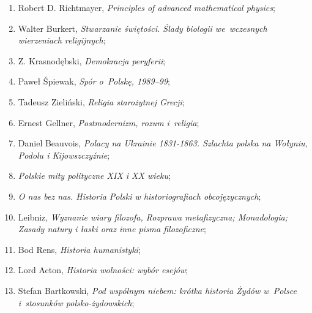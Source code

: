 \documentclass[a4paper,11pt]{article}
\begin{document}
\begin{enumerate}
\item Robert D. Richtmayer, \textit{Principles of advanced mathematical
    physics};



\item Walter Burkert, \textit{Stwarzanie świętości. Ślady biologii
    we~wczesnych wierzeniach religijnych};



\item Z. Krasnodębski, \textit{Demokracja peryferii};



\item Paweł Śpiewak, \textit{Spór o~Polskę, 1989--99};



\item Tadeusz Zieliński, \textit{Religia starożytnej Grecji};



\item Ernest Gellner, \textit{Postmodernizm, rozum i~religia};



\item Daniel Beauvois, \textit{Polacy na Ukrainie 1831-1863. Szlachta
    polska na Wołyniu, Podolu i Kijowszczyźnie};



\item \textit{Polskie mity polityczne XIX i XX wieku};



\item \textit{O nas bez nas. Historia Polski w historiografiach
    obcojęzycznych};



\item Leibniz, \textit{Wyznanie wiary filozofa, Rozprawa metafizyczna;
    Monadologia; Zasady natury i łaski oraz inne pisma filozoficzne};



\item Bod Rens, \textit{Historia humanistyki};



\item Lord Acton, \textit{Historia wolności: wybór esejów};



\item Stefan Bartkowski, \textit{Pod wspólnym niebem: krótka historia
    Żydów w~Polsce i~stosunków polsko-żydowskich};




\end{enumerate}
\end{document}
